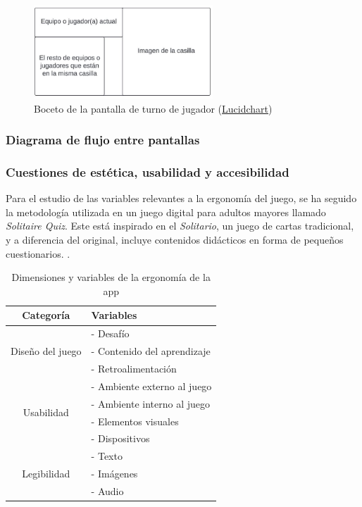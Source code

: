 \begin{figure}[H]
    \centering
    \includegraphics[width=0.6\textwidth]{imgs/boceto-casilla.JPG}
    \caption{Boceto de la pantalla de turno de jugador (\href{https://www.lucidchart.com/pages/es}{Lucidchart})}
    \label{fig:boceto-casilla}
\end{figure}

\subsubsection{Diagrama de flujo entre pantallas}


\subsubsection{Cuestiones de estética, usabilidad y accesibilidad}

Para el estudio de las variables relevantes a la ergonomía del juego, se ha seguido la metodología utilizada en un juego digital para adultos mayores llamado \textit{Solitaire Quiz}. Este está inspirado en el \textit{Solitario}, un juego de cartas tradicional, y a diferencia del original, incluye contenidos didácticos en forma de pequeños cuestionarios. \parencite{diseño2017}.

\begin{table}[H]
	\centering
	\begin{tabular}{|c|p{6cm}|}
		\hline
		\rowcolor{lightgray}
		\textbf{Categoría} & \textbf{Variables}\\
		\hline
		\multirow{3}{*}{Diseño del juego} & - Desafío \\
		& - Contenido del aprendizaje \\
		& - Retroalimentación \\
		\hline
		\multirow{4}{*}{Usabilidad} & - Ambiente externo al juego \\
		& - Ambiente interno al juego \\
		& - Elementos visuales \\
		& - Dispositivos \\
		\hline
		\multirow{3}{*}{Legibilidad} & - Texto \\
		& - Imágenes \\
		& - Audio \\
		\hline
	\end{tabular}
	\caption{Dimensiones y variables de la ergonomía de la app}
	\label{tab:usabilidad}
\end{table}



